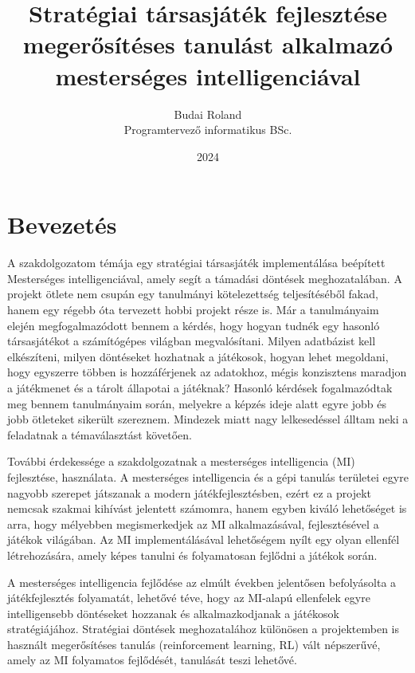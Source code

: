\documentclass[
]{thesis-ekf}
\theoremstyle{definition}
\theoremstyle{remark}
\begin{document}
	
	\title{Stratégiai társasjáték fejlesztése megerősítéses tanulást alkalmazó mesterséges intelligenciával}
	\author{Budai Roland\\Programtervező informatikus BSc.}
	\date{2024}
	\maketitle
	
	\tableofcontents
	
	\chapter*{Bevezetés}
	
	A szakdolgozatom témája egy stratégiai társasjáték implementálása beépített Mesterséges intelligenciával, amely segít a támadási döntések meghozatalában. A projekt ötlete nem csupán egy tanulmányi kötelezettség teljesítéséből fakad, hanem egy régebb óta tervezett hobbi projekt része is. Már a tanulmányaim elején megfogalmazódott bennem a kérdés, hogy hogyan tudnék egy hasonló társasjátékot a számítógépes világban megvalósítani. Milyen adatbázist kell elkészíteni, milyen döntéseket hozhatnak a játékosok, hogyan lehet megoldani, hogy egyszerre többen is hozzáférjenek az adatokhoz, mégis konzisztens maradjon a játékmenet és a tárolt állapotai a játéknak? Hasonló kérdések fogalmazódtak meg bennem tanulmányaim során, melyekre a képzés ideje alatt egyre jobb és jobb ötleteket sikerült szereznem. Mindezek miatt nagy lelkesedéssel álltam neki a feladatnak a témaválasztást követően. 
	
	További érdekessége a szakdolgozatnak a mesterséges intelligencia (MI) fejlesztése, használata. A mesterséges intelligencia és a gépi tanulás területei egyre nagyobb szerepet játszanak a modern játékfejlesztésben, ezért ez a projekt nemcsak szakmai kihívást jelentett számomra, hanem egyben kiváló lehetőséget is arra, hogy mélyebben megismerkedjek az MI alkalmazásával, fejlesztésével a játékok világában. Az MI implementálásával lehetőségem nyílt egy olyan ellenfél létrehozására, amely képes tanulni és folyamatosan fejlődni a játékok során. 
	
	A mesterséges intelligencia fejlődése az elmúlt években jelentősen befolyásolta a játékfejlesztés folyamatát, lehetővé téve, hogy az MI-alapú ellenfelek egyre intelligensebb döntéseket hozzanak és alkalmazkodjanak a játékosok stratégiájához. Stratégiai döntések meghozatalához különösen a projektemben is használt megerősítéses tanulás (reinforcement learning, RL) vált népszerűvé, amely az MI folyamatos fejlődését, tanulását teszi lehetővé.
	
\end{document}
